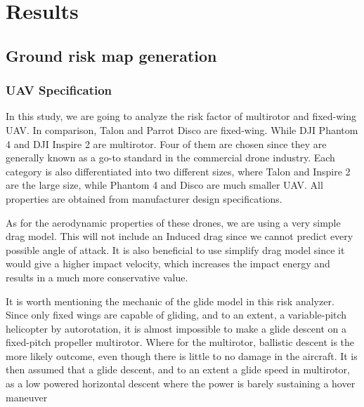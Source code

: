 \documentclass[12pt]{report}
\begin{document}
\chapter{Results}
    \section{Ground risk map generation}
        \subsection{UAV Specification}
        In this study, we are going to analyze the risk factor of multirotor and fixed-wing UAV. In comparison, Talon
        and Parrot Disco are fixed-wing. While DJI Phantom 4 and DJI Inspire 2 are multirotor. Four of them are chosen
        since they are generally known as a go-to standard in the commercial drone industry. Each category is also
        differentiated into two different sizes, where Talon and Inspire 2 are the large size, while Phantom 4 and Disco
        are much smaller UAV. All properties are obtained from manufacturer design specifications.
            
        As for the aerodynamic properties of these drones, we are using a very simple drag model. This will not include
        an Induced drag since we cannot predict every possible angle of attack. It is also beneficial to use simplify
        drag model since it would give a higher impact velocity, which increases the impact energy and results in a much
        more conservative value.
            
        It is worth mentioning the mechanic of the glide model in this risk analyzer. Since only fixed wings are capable
        of gliding, and to an extent, a variable-pitch helicopter by autorotation, it is almost impossible to make a
        glide descent on a fixed-pitch propeller multirotor. Where for the multirotor, ballistic descent is the more
        likely outcome, even though there is little to no damage in the aircraft. It is then assumed that a glide
        descent, and to an extent a glide speed in multirotor, as a low powered horizontal descent where the power is
        barely sustaining a hover maneuver
\end{document}
